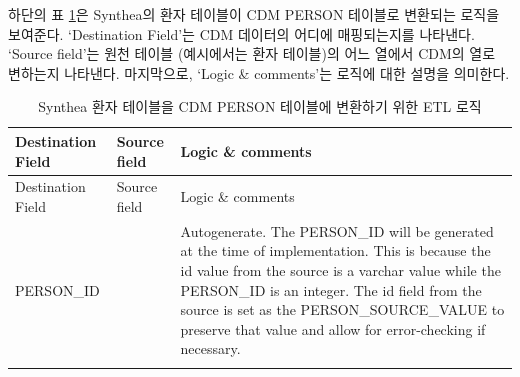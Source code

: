 \documentclass[10.5pt]{book}
\theoremstyle{definition}
\theoremstyle{definition}
\theoremstyle{definition}
\theoremstyle{remark}
\begin{document}
하단의 표 \ref{tab:syntheaEtlPerson}은 Synthea의 환자 테이블이 CDM
PERSON 테이블로 변환되는 로직을 보여준다. `Destination Field'는 CDM
데이터의 어디에 매핑되는지를 나타낸다. `Source field'는 원천 테이블
(예시에서는 환자 테이블)의 어느 열에서 CDM의 열로 변하는지 나타낸다.
마지막으로, `Logic \& comments'는 로직에 대한 설명을 의미한다.

\begin{longtable}[]{@{}lll@{}}
\caption{\label{tab:syntheaEtlPerson} Synthea 환자 테이블을 CDM PERSON
테이블에 변환하기 위한 ETL 로직}\tabularnewline
\toprule
\begin{minipage}[b]{0.28\columnwidth}\raggedright\strut
Destination Field\strut
\end{minipage} & \begin{minipage}[b]{0.13\columnwidth}\raggedright\strut
Source field\strut
\end{minipage} & \begin{minipage}[b]{0.50\columnwidth}\raggedright\strut
Logic \& comments\strut
\end{minipage}\tabularnewline
\midrule
\endfirsthead
\toprule
\begin{minipage}[b]{0.28\columnwidth}\raggedright\strut
Destination Field\strut
\end{minipage} & \begin{minipage}[b]{0.13\columnwidth}\raggedright\strut
Source field\strut
\end{minipage} & \begin{minipage}[b]{0.50\columnwidth}\raggedright\strut
Logic \& comments\strut
\end{minipage}\tabularnewline
\midrule
\endhead
\begin{minipage}[t]{0.28\columnwidth}\raggedright\strut
PERSON\_ID\strut
\end{minipage} & \begin{minipage}[t]{0.13\columnwidth}\raggedright\strut
\strut
\end{minipage} & \begin{minipage}[t]{0.50\columnwidth}\raggedright\strut
Autogenerate. The PERSON\_ID will be generated at the time of
implementation. This is because the id value from the source is a
varchar value while the PERSON\_ID is an integer. The id field from the
source is set as the PERSON\_SOURCE\_VALUE to preserve that value and
allow for error-checking if necessary.\strut
\end{minipage}\tabularnewline
\begin{minipage}[t]{0.28\columnwidth}\raggedright\strut

\end{minipage}
\end{longtable}
\end{document}

